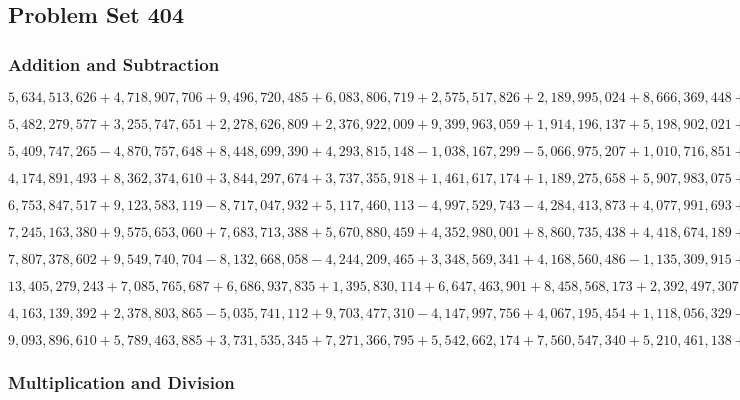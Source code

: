 \hypertarget{problem-set-404}{%
\subsection{Problem Set 404}\label{problem-set-404}}

\hypertarget{addition-and-subtraction}{%
\subsubsection{Addition and
Subtraction}\label{addition-and-subtraction}}

\(5,634,513,626+4,718,907,706+9,496,720,485+6,083,806,719+2,575,517,826+2,189,995,024+8,666,369,448+3,908,702,402+7,323,578,570+6,502,441,111\)

\(5,482,279,577+3,255,747,651+2,278,626,809+2,376,922,009+9,399,963,059+1,914,196,137+5,198,902,021+8,815,371,713+5,448,891,425+2,695,125,999\)

\(5,409,747,265-4,870,757,648+8,448,699,390+4,293,815,148-1,038,167,299-5,066,975,207+1,010,716,851+5,829,762,695+2,091,857,154-5,768,162,703\)

\(4,174,891,493+8,362,374,610+3,844,297,674+3,737,355,918+1,461,617,174+1,189,275,658+5,907,983,075+8,947,856,673+7,755,286,651+9,713,496,357\)

\(6,753,847,517+9,123,583,119-8,717,047,932+5,117,460,113-4,997,529,743-4,284,413,873+4,077,991,693+1,781,450,037+7,019,967,145-1,990,413,321\)

\(7,245,163,380+9,575,653,060+7,683,713,388+5,670,880,459+4,352,980,001+8,860,735,438+4,418,674,189+6,270,773,040+9,642,442,976+4,112,186,456\)

\(7,807,378,602+9,549,740,704-8,132,668,058-4,244,209,465+3,348,569,341+4,168,560,486-1,135,309,915+1,149,619,304-1,094,325,766+4,539,348,324\)

\(13,405,279,243+7,085,765,687+6,686,937,835+1,395,830,114+6,647,463,901+8,458,568,173+2,392,497,307+7,898,414,965+8,533,827,600+7,355,691,393\)

\(4,163,139,392+2,378,803,865-5,035,741,112+9,703,477,310-4,147,997,756+4,067,195,454+1,118,056,329-3,831,789,287+1,677,197,732-5,254,139,583\)

\(9,093,896,610+5,789,463,885+3,731,535,345+7,271,366,795+5,542,662,174+7,560,547,340+5,210,461,138+9,376,049,404+2,046,148,872+3,215,411,569\)

\hypertarget{multiplication-and-division}{%
\subsubsection{Multiplication and
Division}\label{multiplication-and-division}}

